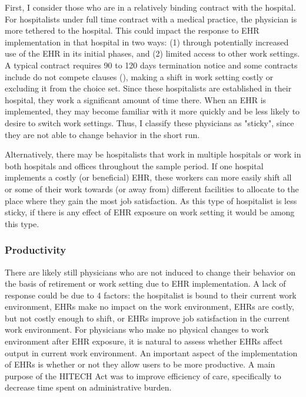 \documentclass[12pt]{article}
\begin{document}
First, I consider those who are in a relatively binding contract with the hospital. For hospitalists under full time contract with a medical practice, the physician is more tethered to the hospital. This could impact the response to EHR implementation in that hospital in two ways: (1) through potentially increased use of the EHR in its initial phases, and (2) limited access to other work settings. A typical contract requires 90 to 120 days termination notice and some contracts include do not compete clauses (\cite{yasgur_by_-_yasgur_2016}), making a shift in work setting costly or excluding it from the choice set. Since these hospitalists are established in their hospital, they work a significant amount of time there. When an EHR is implemented, they may become familiar with it more quickly and be less likely to desire to switch work settings. Thus, I classify these physicians as "sticky", since they are not able to change behavior in the short run.

Alternatively, there may be hospitalists that work in multiple hospitals or work in both hospitals and offices throughout the sample period. If one hospital implements a costly (or beneficial) EHR, these workers can more easily shift all or some of their work towards (or away from) different facilities to allocate to the place where they gain the most job satisfaction. As this type of hospitalist is less sticky, if there is any effect of EHR exposure on work setting it would be among this type. 


\subsubsection{Productivity}

There are likely still physicians who are not induced to change their behavior on the basis of retirement or work setting due to EHR implementation. A lack of response could be due to 4 factors: the hospitalist is bound to their current work environment, EHRs make no impact on the work environment, EHRs are costly, but not costly enough to shift, or EHRs improve job satisfaction in the current work environment. For physicians who make no physical changes to work environment after EHR exposure, it is natural to assess whether EHRs affect output in current work environment. An important aspect of the implementation of EHRs is whether or not they allow users to be more productive. A main purpose of the HITECH Act was to improve efficiency of care, specifically to decrease time spent on administrative burden. 
\end{document}
